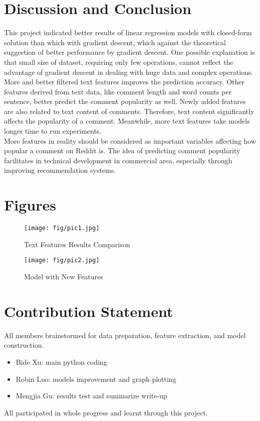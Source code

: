 \documentclass[letterpaper, 12pt]{article}
\begin{document}
\section*{Discussion and Conclusion}

This project indicated better results of linear regression models with closed-form solution than which with gradient descent, which against the theoretical suggestion of better performance by gradient descent. One possible explanation is that small size of dataset, requiring only few operations, cannot reflect the advantage of gradient descent in dealing with huge data and complex operations.\\

More and better filtered text features improves the prediction accuracy. Other features derived from text data, like comment length and word counts per sentence, better predict the comment popularity as well. Newly added features are also related to text content of comments. Therefore, text content significantly affects the popularity of a comment. Meanwhile, more text features take models longer time to run experiments.\\

More features in reality should be considered as important variables affecting how popular a comment on Reddit is. The idea of predicting comment popularity facilitates in technical development in commercial area, especially through improving recommendation systems.

\nocite{*}


\begingroup
    
\endgroup

\section*{Figures}

\begin{figure}[h]
\centering
\texttt{[image: fig/pic1.jpg]}
\caption{Text Features Results Comparison}
\label{fig: fig1}
\end{figure}

\begin{figure}[h]
\centering
\texttt{[image: fig/pic2.jpg]}
\caption{Model with New Features}
\label{fig: fig2}
\end{figure}

\newpage
\section*{Contribution Statement}

All members brainstormed for data preparation, feature extraction, and model construction.
\begin{itemize}
    \item Bide Xu: main python coding
    \item Robin Luo: models improvement and graph plotting
    \item Mengjia Gu: results test and summarize write-up
\end{itemize}All participated in whole progress and learnt through this project.
\end{document}
